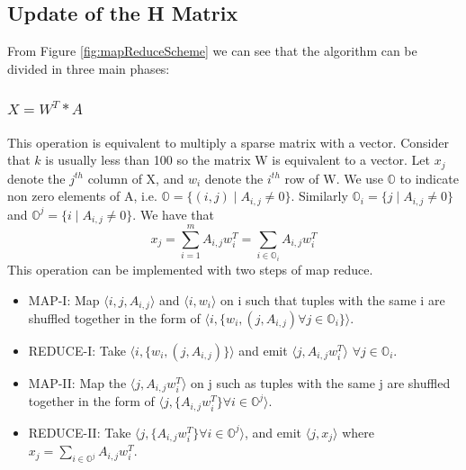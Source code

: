 \documentclass[a4paper,12pt]{article}
\begin{document}
 \subsection{Update of the H Matrix}
 \label{sec:hupdate}
    From Figure \ref{fig:mapReduceScheme} we can see that the algorithm can be divided in three main phases:
    
  \subsubsection{$ X = W^T * A $}
        This operation is equivalent to multiply a sparse matrix with a vector. 
        Consider that $k$ is usually less than 100 so the matrix W is equivalent to a vector. 
		Let $x_j$ denote the $j^{th}$ column of X, and $w_i$ denote the $i^{th}$ row of W.
		We use $\mathbb{O}$ to indicate non zero elements of A, i.e. $\mathbb{O} = \{ (i,j) \;|\; A_{i,j}  \neq 0 \}$.
		Similarly $\mathbb{O}_i = \{j \;|\; A_{i,j} \neq 0 \}$ and $\mathbb{O}^j = \{i \;|\; A_{i,j} \neq 0 \}$.
		We have that
        $$ x_j = \sum_{i=1}^{m} A_{i,j} w_{i}^{T} = \sum_{i \in \mathbb{O}_i} A_{i,j} w_{i}^{T} $$ 
        This operation can be implemented with two steps of map reduce.
        
        \begin{itemize}
          \item MAP-I: Map $ \langle i, j, A_{i,j} \rangle $ and $\langle i, w_i \rangle$ on i
            such that tuples with the same i are shuffled together in
            the form of  $ \langle i, \{w_{i}, (j, A_{i,j}) \forall j
            \in \mathbb{O}_i \} \rangle$.

         \item REDUCE-I: Take  $ \langle i, \{w_{i}, (j, A_{i,j}) \}
           \rangle$ and emit  $ \langle j, A_{i,j}  w_{i}^{T}
           \rangle$ $\forall j \in \mathbb{O}_i $.

          \item MAP-II: Map the $ \langle j, A_{i,j}  w_{i}^{T}
           \rangle$ on j such as tuples with the same j are shuffled
           together in the form of $ \langle j, \{A_{i,j}  w_{i}^{T} \}
           \forall i \in \mathbb{O}^j \rangle$.

          \item REDUCE-II: Take $ \langle j, \{A_{i,j}  w_{i}^{T} \}
           \forall i \in \mathbb{O}^j \rangle$, and emit $\langle j,
           x_j \rangle$ where $ x_j = \sum_{i \in \mathbb{O}^j} A_{i,j}  w_{i}^{T} $.

         \end{itemize}
\end{document}
